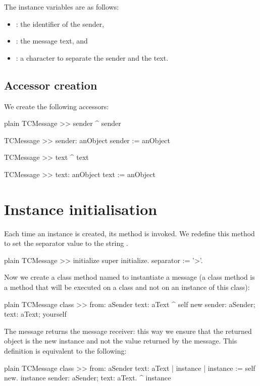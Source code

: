 \documentclass[10pt,twoside,english]{_support/latex/sbabook/sbabook}
\begin{document}
The instance variables are as follows: 

\begin{itemize}
\item {}: the identifier of the sender,
\item {}: the message text, and 
\item {}: a character to separate the sender and the text.
\end{itemize}
\subsection{Accessor creation}
We create the following accessors:

\begin{displaycode}{plain}
TCMessage >> sender
	^ sender

TCMessage >> sender: anObject
	sender := anObject

TCMessage >> text
	^ text

TCMessage >> text: anObject
	text := anObject
\end{displaycode}
\section{Instance initialisation}
Each time an instance is created, its  method is invoked. 
We redefine this method to set the separator value to the string \textcode{\textgreater{}}.

\begin{displaycode}{plain}
TCMessage >> initialize
	super initialize.
	separator := '>'.
\end{displaycode}

Now we create a class method named  to instantiate a message (a class method is a method that will be executed on a class and not on an instance of this class):

\begin{displaycode}{plain}
TCMessage class >> from: aSender text: aText
	^ self new sender: aSender; text: aText; yourself
\end{displaycode}

The message  returns the message receiver: this way we ensure that the returned object is the new instance and not the value returned by the  message. This definition is equivalent to the following:

\begin{displaycode}{plain}
TCMessage class >> from: aSender text: aText
	| instance |
	instance := self new.
	instance sender: aSender; text: aText.
	^ instance
\end{displaycode}
\end{document}
